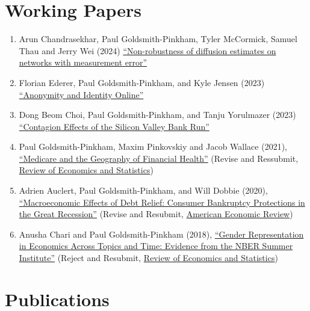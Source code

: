 \documentclass[letterpaper]{article}
\begin{document}
\section*{Working Papers}

\begin{enumerate}
\item Arun Chandrasekhar, Paul Goldsmith-Pinkham, Tyler McCormick, Samuel Thau and Jerry Wei (2024) \href{https://paulgp.github.io/papers/diffusion_error_CGPMTW.pdf}{``Non-robustness of diffusion estimates on networks with measurement error''}
\item Florian Ederer, Paul Goldsmith-Pinkham, and Kyle Jensen (2023) \href{https://florianederer.github.io/ejmr.pdf}{``Anonymity and Identity Online''}
\item Dong Beom Choi, Paul Goldsmith-Pinkham, and Tanju Yorulmazer (2023) \href{https://arxiv.org/pdf/2308.06642.pdf}{``Contagion Effects of the Silicon Valley Bank Run''} 
\item Paul Goldsmith-Pinkham, Maxim Pinkovskiy and Jacob Wallace (2021), \href{http://paulgp.github.io/papers/GPW_compressed.pdf}{``Medicare and the Geography of Financial Health''} (Revise and Ressubmit, \ul{Review of Economics and Statistics})
\item Adrien Auclert, Paul Goldsmith-Pinkham, and Will Dobbie (2020), \href{http://paulgp.github.io/papers/Macroeconomic_Effects_of_Debt_Relief_Posting_342019.pdf}{``Macroeconomic Effects of Debt Relief: Consumer Bankruptcy Protections in the Great Recession''} (Revise and Resubmit, \ul{American Economic Review})
\item Anusha Chari and  Paul Goldsmith-Pinkham (2018), \href{http://paulgp.github.io/papers/cgp_nbergender.pdf}{``Gender Representation in Economics Across Topics and Time: Evidence from the NBER Summer Institute''} (Reject and Resubmit, \ul{Review of Economics and Statistics})
\end{enumerate}

\section*{Publications}
\end{document}

